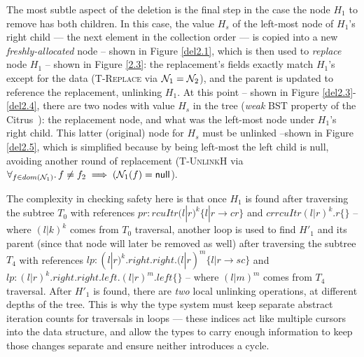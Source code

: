 The most subtle aspect of the deletion is the final step in the case the node $H_1$ to remove has both children. In this case, the value $H_s$ of the left-most node of $H_1$'s right child --- the next element in the collection order --- is copied into a new \textit{freshly-allocated} node -- shown in Figure \ref{del2.1}, which is then used to \emph{replace} node $H_1$ -- shown in Figure \ref{2.3}: the replacement's fields exactly match $H_1$'s except for the data (\textsc{T-Replace} via $\mathcal{N}_1 = \mathcal{N}_2$), and the parent is updated to reference the replacement, unlinking $H_1$. At this point -- shown in Figure \ref{del2.3}-\ref{del2.4}, there are two nodes with value $H_s$ in the tree (\textit{weak} BST property of the Citrus~\cite{Arbel:2014:CUR:2611462.2611471}): the replacement node, and what was the left-most node under $H_1$'s right child. This latter (original) node for $H_s$ must be unlinked --shown in Figure \ref{del2.5}, which is simplified because by being left-most the left child is null, avoiding another round of replacement (\textsc{T-UnlinkH} via $\forall_{f\in dom(\mathcal{N}_1)} \ldotp f\neq f_2 \implies (\mathcal{N}_1(f) = \textsf{null}$).

The complexity in checking safety here is that once $H_1$ is found after traversing the subtree $T_0$ with references $pr:rcuItr(l|r)^{k} \{l|r \rightarrow cr\}$ and $crrcuItr(l|r)^{k}.r \{\}$ -- where $(l|k)^{k}$ comes from $T_0$ traversal, another loop is used to find $H'_1$ and its parent (since that node will later be removed as well) after traversing the subtree $T_4$ with references $lp:(l|r)^{k}.right.right.(l|r)^{m} \{l|r \rightarrow sc\}$ and $lp:(l|r)^{k}.right.right.left.(l|r)^{m}.left \{\}$ -- where $(l|m)^{m}$ comes from $T_4$ traversal.
After $H'_1$ is found, there are \emph{two} local unlinking operations, at different depths of the tree.  This is why the type system must keep separate abstract iteration counts for traversals in loops --- these indices act like multiple cursors into the data structure, and allow the types to carry enough information to keep those changes separate and ensure neither introduces a cycle.

